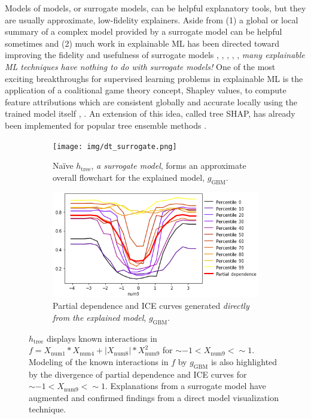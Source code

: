 \documentclass{article}
\begin{document}
Models of models, or surrogate models, can be helpful explanatory tools, but they are usually approximate, low-fidelity explainers. Aside from (1) a global or local summary of a complex model provided by a surrogate model can be helpful sometimes and (2) much work in explainable ML has been directed toward improving the fidelity and usefulness of surrogate models \cite{dt_surrogate2}, \cite{viper}, \cite{dt_surrogate1}, \cite{lime-sup}, \cite{wf_xnn}, \textit{many explainable ML techniques have nothing to do with surrogate models!} One of the most exciting breakthroughs for supervised learning problems in explainable ML is the application of a coalitional game theory concept, Shapley values, to compute feature attributions which are consistent globally and accurate locally using the trained model itself \cite{shapley}, \cite{kononenko2010efficient}. An extension of this idea, called tree SHAP, has already been implemented for popular tree ensemble methods \cite{tree_shap}. 

\begin{figure}[htb!]
	\begin{subfigure}{.55\textwidth}
		\texttt{[image: img/dt\_surrogate.png]}
  		\caption{Na\"ive $h_{\text{tree}}$, \textit{a surrogate model}, forms an approximate overall flowchart for the explained model, $g_{\text{GBM}}$.}
  		\label{fig:dt_surrogate}
	\end{subfigure}\hspace{5pt}
	\begin{subfigure}{.45\textwidth}
  		\includegraphics[height=.52\linewidth, width=1.02\linewidth]{img/pdp_ice.png}
  		\caption{Partial dependence and ICE curves generated \textit{directly from the explained model}, $g_{\text{GBM}}$.}
  		\label{fig:pdp_ice}
	\end{subfigure}
	\caption{$h_{\text{tree}}$ displays known interactions in $f = X_{\text{num}1} * X_{\text{num}4} + |X_{\text{num}8}| * X_{\text{num}9}^2$ for $\sim -1 < X_{\text{num9}} <  \sim 1$. Modeling of the known interactions in $f$ by $g_{\text{GBM}}$ is also highlighted by the divergence of partial dependence and ICE curves for $\sim -1 < X_{\text{num9}} <  \sim 1$. Explanations from a surrogate model have augmented and confirmed findings from a direct model visualization technique.}
	\label{fig:pdp_ice_dt_surrogate}
\end{figure}
\end{document}
